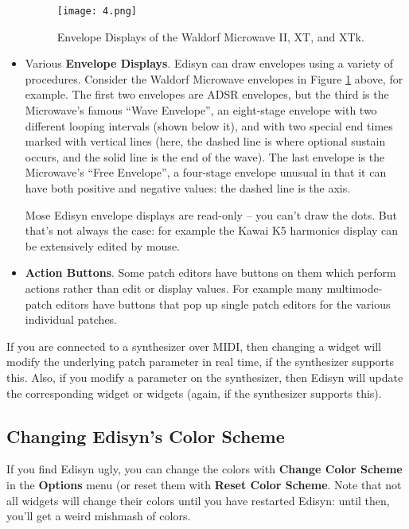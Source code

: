 \documentclass{article}
\begin{document}
\begin{itemize}
\begin{figure}[t]
\begin{center}
\texttt{[image: 4.png]}
\end{center}
\caption{Envelope Displays of the Waldorf Microwave II, XT, and XTk.}
\label{envelopedisplays}
\end{figure}

\item Various {\bf Envelope Displays}.  Edisyn can draw envelopes using a variety of procedures.  Consider the Waldorf Microwave envelopes in Figure \ref{envelopedisplays} above, for example.  The first two envelopes are ADSR envelopes, but the third is the Microwave's famous ``Wave Envelope'', an eight-stage envelope with two different looping intervals (shown below it), and with two special end times marked with vertical lines (here, the dashed line is where optional sustain occurs, and the solid line is the end of the wave).    The last envelope is the Microwave's ``Free Envelope'', a four-stage envelope unusual in that it can have both positive and negative values: the dashed line is the axis.

Mose Edisyn envelope displays are read-only -- you can't draw the dots.  But that's not always the case: for example the Kawai K5 harmonics display can be extensively edited by mouse.

\item {\bf Action Buttons}.  Some patch editors have buttons on them which perform actions rather than edit or display values.  For example many multimode-patch editors have buttons that pop up single patch editors for the various individual patches.

\end{itemize}

If you are connected to a synthesizer over MIDI, then changing a widget will modify the underlying patch parameter in real time, if the synthesizer supports this.  Also, if you modify a parameter on the synthesizer, then Edisyn will update the corresponding widget or widgets (again, if the synthesizer supports this).

\subsection{Changing Edisyn's Color Scheme}  If you find Edisyn ugly, you can change the colors with {\bf Change Color Scheme} in the {\bf Options} menu (or reset them with {\bf Reset Color Scheme}.  Note that not all widgets will change their colors until you have restarted Edisyn: until then, you'll get a weird mishmash of colors.
\end{document}

